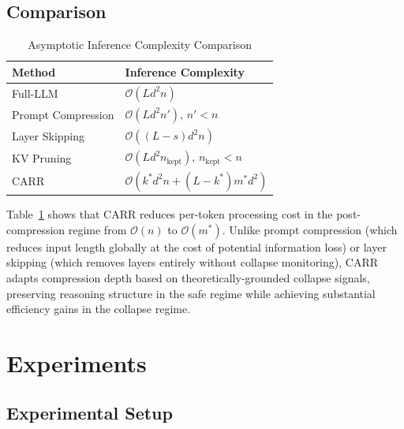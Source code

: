 \documentclass[lettersize,journal]{IEEEtran}
\begin{document}
\subsection{Comparison}

\begin{table}[!t]
\caption{Asymptotic Inference Complexity Comparison\label{tab:complexity}}
\centering
\begin{tabular}{l|l}
\toprule
\textbf{Method} & \textbf{Inference Complexity} \\
\midrule
Full-LLM & $\mathcal{O}(L d^2 n)$ \\
Prompt Compression & $\mathcal{O}(L d^2 n')$, $n' < n$ \\
Layer Skipping & $\mathcal{O}((L-s) d^2 n)$ \\
KV Pruning & $\mathcal{O}(L d^2 n_{\mathrm{kept}})$, $n_{\mathrm{kept}} < n$ \\
CARR & $\mathcal{O}(k^* d^2 n + (L-k^*) m^* d^2)$ \\
\bottomrule
\end{tabular}
\end{table}

Table~\ref{tab:complexity} shows that CARR reduces per-token processing cost in the post-compression regime from $\mathcal{O}(n)$ to $\mathcal{O}(m^*)$. Unlike prompt compression (which reduces input length globally at the cost of potential information loss) or layer skipping (which removes layers entirely without collapse monitoring), CARR adapts compression depth based on theoretically-grounded collapse signals, preserving reasoning structure in the safe regime while achieving substantial efficiency gains in the collapse regime.

\section{Experiments}

\subsection{Experimental Setup}
\end{document}
